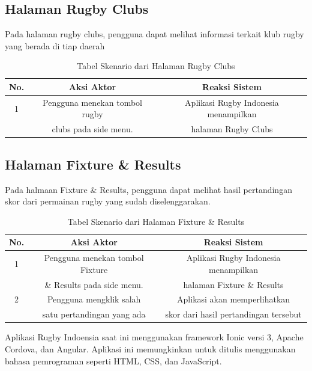 \subsection{Halaman Rugby Clubs}
Pada halaman rugby clubs, pengguna dapat melihat informasi terkait klub rugby yang berada di tiap daerah

\begin{table} [!h]
    \centering
    \caption{Tabel Skenario dari Halaman Rugby Clubs}
    \begin{tabular}{|c|c|c|}
    \hline
       No. & Aksi Aktor & Reaksi Sistem  \\ \hline
        1 & Pengguna menekan tombol rugby & Aplikasi Rugby Indonesia menampilkan \\
         &  clubs pada side menu. & halaman Rugby Clubs \\ \hline
    \end{tabular}
    \label{tab:existing-scenario-rugby-clubs-page}
\end{table}

\subsection{Halaman Fixture \& Results}
Pada halmaan Fixture \& Results, pengguna dapat melihat hasil pertandingan skor dari permainan rugby yang sudah diselenggarakan.

\begin{table} [!h]
    \centering
    \caption{Tabel Skenario dari Halaman Fixture \& Results}
    \begin{tabular}{|c|c|c|}
    \hline
       No. & Aksi Aktor & Reaksi Sistem  \\ \hline
        1 & Pengguna menekan tombol Fixture & Aplikasi Rugby Indonesia menampilkan \\
         & \& Results pada side menu. & halaman Fixture \& Results \\ \hline
        2 & Pengguna mengklik salah & Aplikasi akan memperlihatkan \\ 
         & satu pertandingan yang ada & skor dari hasil pertandingan tersebut \\ \hline
    \end{tabular}
    \label{tab:existing-scenario-fixture-results-page}
\end{table}

Aplikasi Rugby Indoensia saat ini menggunakan framework Ionic versi 3, Apache Cordova, dan Angular. Aplikasi ini memungkinkan untuk ditulis menggunakan bahasa pemrograman seperti HTML, CSS, dan JavaScript.

